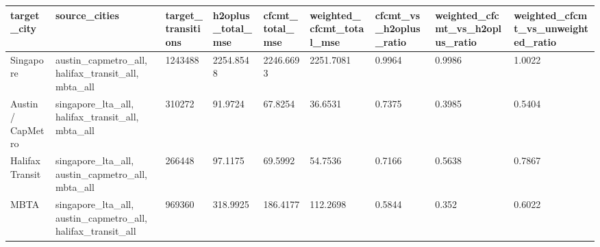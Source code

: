 \begin{tabular}{lllllllll}
\toprule
target\_city & source\_cities & target\_transitions & h2oplus\_total\_mse & cfcmt\_total\_mse & weighted\_cfcmt\_total\_mse & cfcmt\_vs\_h2oplus\_ratio & weighted\_cfcmt\_vs\_h2oplus\_ratio & weighted\_cfcmt\_vs\_unweighted\_ratio \\
\midrule
Singapore & austin\_capmetro\_all, halifax\_transit\_all, mbta\_all & 1243488 & 2254.8548 & 2246.6693 & 2251.7081 & 0.9964 & 0.9986 & 1.0022 \\
Austin / CapMetro & singapore\_lta\_all, halifax\_transit\_all, mbta\_all & 310272 & 91.9724 & 67.8254 & 36.6531 & 0.7375 & 0.3985 & 0.5404 \\
Halifax Transit & singapore\_lta\_all, austin\_capmetro\_all, mbta\_all & 266448 & 97.1175 & 69.5992 & 54.7536 & 0.7166 & 0.5638 & 0.7867 \\
MBTA & singapore\_lta\_all, austin\_capmetro\_all, halifax\_transit\_all & 969360 & 318.9925 & 186.4177 & 112.2698 & 0.5844 & 0.352 & 0.6022 \\
\bottomrule
\end{tabular}
